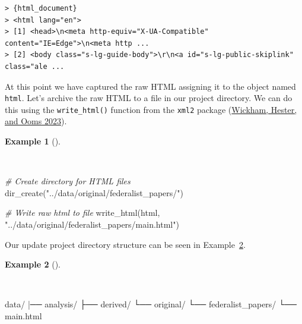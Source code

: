 \documentclass[
  letterpaper,
  DIV=11,
  numbers=noendperiod]{scrreport}
\newenvironment{Shaded}{\begin{snugshade}}{\end{snugshade}}
\newcommand{\CommentTok}[1]{\textcolor[rgb]{0.00,0.00,0.00}{\textit{#1}}}
\newcommand{\ExtensionTok}[1]{\textcolor[rgb]{0.00,0.00,0.00}{#1}}
\newcommand{\FunctionTok}[1]{\textcolor[rgb]{0.00,0.00,0.00}{#1}}
\newcommand{\KeywordTok}[1]{\textcolor[rgb]{0.00,0.00,0.00}{#1}}
\newcommand{\NormalTok}[1]{\textcolor[rgb]{0.00,0.00,0.00}{#1}}
\newcommand{\StringTok}[1]{\textcolor[rgb]{0.00,0.00,0.00}{#1}}
\theoremstyle{definition}
\newtheorem{example}{Example}[chapter]
\theoremstyle{remark}
\begin{document}
\begin{verbatim}
> {html_document}
> <html lang="en">
> [1] <head>\n<meta http-equiv="X-UA-Compatible" content="IE=Edge">\n<meta http ...
> [2] <body class="s-lg-guide-body">\r\n<a id="s-lg-public-skiplink" class="ale ...
\end{verbatim}

At this point we have captured the raw HTML assigning it to the object
named \texttt{html}. Let's archive the raw HTML to a file in our project
directory. We can do this using the \texttt{write\_html()} function from
the \texttt{xml2} package (\protect\hyperlink{ref-R-xml2}{Wickham,
Hester, and Ooms 2023}).

\begin{example}[]\protect\hypertarget{exm-ad-fed-write-html}{}\label{exm-ad-fed-write-html}

~

\begin{Shaded}
\begin{Highlighting}[]
\CommentTok{\# Create directory for HTML files}
\FunctionTok{dir\_create}\NormalTok{(}\StringTok{"../data/original/federalist\_papers/"}\NormalTok{)}

\CommentTok{\# Write raw html to file}
\FunctionTok{write\_html}\NormalTok{(html, }\StringTok{"../data/original/federalist\_papers/main.html"}\NormalTok{)}
\end{Highlighting}
\end{Shaded}

\end{example}

Our update project directory structure can be seen in
Example~\ref{exm-ad-fed-project-dir}.

\begin{example}[]\protect\hypertarget{exm-ad-fed-project-dir}{}\label{exm-ad-fed-project-dir}

~

\begin{Shaded}
\begin{Highlighting}[]
\ExtensionTok{data/}
\KeywordTok{|}\ExtensionTok{──}\NormalTok{ analysis/}
\ExtensionTok{├──}\NormalTok{ derived/}
\ExtensionTok{└──}\NormalTok{ original/}
    \ExtensionTok{└──}\NormalTok{ federalist\_papers/}
        \ExtensionTok{└──}\NormalTok{ main.html}
\end{Highlighting}
\end{Shaded}

\end{example}
\end{document}
